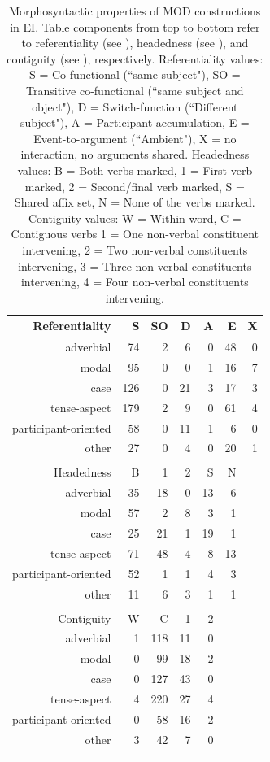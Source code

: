 \begin{table}
\centering
\begin{tabular}{rrrrrrr}
  \lsptoprule
Referentiality & S & SO & D & A & E & X \\ 
  \midrule
  adverbial &  74 &   2 &   6 &   0 &  48 &   0 \\ 
  modal &  95 &   0 &   0 &   1 &  16 &   7 \\ 
  case & 126 &   0 &  21 &   3 &  17 &   3 \\ 
  tense-aspect & 179 &   2 &   9 &   0 &  61 &   4 \\ 
  participant-oriented &  58 &   0 &  11 &   1 &   6 &   0 \\ 
  other &  27 &   0 &   4 &   0 &  20 &   1 \\ 
   \midrule
 \\
  \midrule
Headedness & B & 1 & 2 & S & N \\ 
  \midrule
  adverbial &  35 &  18 &   0 &  13 &   6 \\ 
  modal &  57 &   2 &   8 &   3 &   1 \\ 
  case &  25 &  21 &   1 &  19 &   1 \\ 
  tense-aspect &  71 &  48 &   4 &   8 &  13 \\ 
  participant-oriented &  52 &   1 &   1 &   4 &   3 \\ 
  other &  11 &   6 &   3 &   1 &   1 \\ 
   \midrule
 \\
  \midrule
Contiguity & W & C & 1 & 2 \\ 
  \midrule
  adverbial &   1 & 118 &  11 &   0 \\ 
  modal &   0 &  99 &  18 &   2 \\ 
  case &   0 & 127 &  43 &   0 \\ 
  tense-aspect &   4 & 220 &  27 &   4 \\ 
  participant-oriented &   0 &  58 &  16 &   2 \\ 
  other &   3 &  42 &   7 &   0 \\ 
   \lspbottomrule
\end{tabular}
\caption[Morphosyntactic properties of MOD constructions]{Morphosyntactic properties of MOD constructions in EI. Table components from top to bottom refer to referentiality (see ), headedness (see ), and contiguity (see ), respectively. Referentiality values: S = Co-functional (``same subject"), SO = Transitive co-functional (``same subject and object"), D = Switch-function (``Different subject"), A = Participant accumulation, E = Event-to-argument (``Ambient"), X = no interaction, no arguments shared. Headedness values: B = Both verbs marked, 1 = First verb marked, 2 = Second/final verb marked, S = Shared affix set, N = None of the verbs marked. Contiguity values: W = Within word, C = Contiguous verbs 1 = One non-verbal constituent intervening, 2 = Two non-verbal constituents intervening, 3 = Three non-verbal constituents intervening, 4 = Four non-verbal constituents intervening.}
\label{table:mod_formal}
\end{table}

